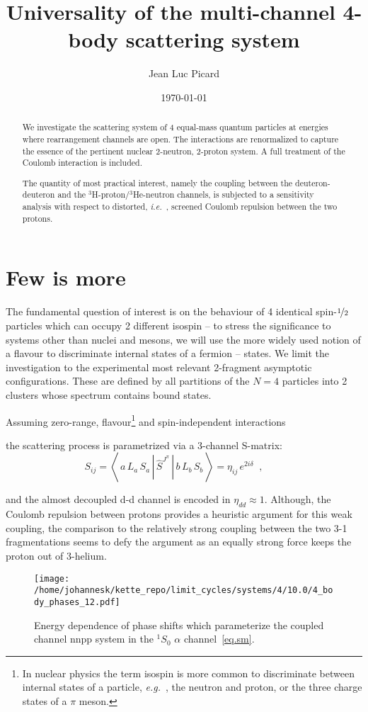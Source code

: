 \documentclass[onecolumn,preprint,superscriptaddress,nofootinbib,notitlepage,10pt,linenumbers]{revtex4-1}
\newcommand{\eg}{\textit{e.g.}~}
\newcommand{\ie}{\textit{i.e.}~}
\newcommand{\be}{\begin{equation}}
\newcommand{\ee}{\end{equation}}
\newcommand{\la}{\label}
\newcommand{\me}[3] {\left\langle\,#1\,\left|\left.\,#2\,\right|\,#3\,\right.\right\rangle}
\begin{document}
\title{Universality of the multi-channel 4-body scattering system}
\author{Jean Luc Picard}
\date{\today}

\begin{abstract}
We investigate the scattering system of 4 equal-mass quantum particles at energies
where rearrangement channels are open. The interactions are renormalized to capture
the essence of the pertinent nuclear 2-neutron, 2-proton system. A full
treatment of the Coulomb interaction is included.

The quantity of most practical interest, namely the coupling between the deuteron-deuteron
and the ${}^3$H-proton/${}^3$He-neutron channels, is subjected to a sensitivity analysis
with respect to distorted, \ie, screened Coulomb repulsion between the two protons.
\end{abstract}

\maketitle

\section{Few is more}

The fundamental question of interest is on the behaviour of 4
identical spin-$\nicefrac{1}{2}$ particles which can occupy 2
different isospin -- to stress the significance to systems other than
nuclei and mesons, we will use the more widely used notion of a flavour to discriminate
internal states of a fermion -- states.
We limit the investigation to the experimental most relevant 2-fragment
asymptotic configurations. These are defined by all partitions of the
$N=4$ particles into 2 clusters whose spectrum contains bound states.



Assuming zero-range, flavour\footnote{In nuclear physics the term 
isospin is more common to discriminate between internal states of a particle,
\eg, the neutron and proton, or the three charge states of a $\pi$ meson.} 
and spin-independent interactions 

the scattering process is parametrized via a 3-channel S-matrix:
\be
\la{eq.sm}
S_{ij}=\me{a\,L_a\,S_a}{\hat{S}^{J^\pi}}{b\,L_b\,S_b}=\eta_{ij}\,e^{2i\delta}
\;\;,\qquad
\ee

and the almost decoupled d-d channel is encoded in $\eta_{dd}\approx 1$. Although, the Coulomb repulsion between protons
provides a heuristic argument for this weak coupling, the comparison to the relatively strong coupling between the two 3-1
fragmentations seems to defy the argument as an equally strong force keeps the proton out of 3-helium.

\begin{figure}[tb]
\centerline{\texttt{[image: /home/johannesk/kette\_repo/limit\_cycles/systems/4/10.0/4\_body\_phases\_12.pdf]}}
\caption{\label{fig.dd-phases} Energy dependence of phase shifts which parameterize the coupled channel
nnpp system in the ${}^1S_0$ $\alpha$ channel~\eqref{eq.sm}.
}
\end{figure}


\end{document}
